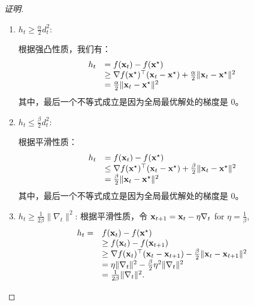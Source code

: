 \begin{proof}[证明]

\begin{enumerate}
\item  $h_t \geq \frac{\alpha}{2} d_t^2 $: %

根据强凸性质，我们有：
\begin{equation*}
\begin{array}{cl}
h_t & =  f(\mathbf x_t) - f(\mathbf x^{\star}) \\
& \geq  \nabla f(\mathbf x^{\star})^\top (\mathbf x_t - \mathbf x^{\star}) + \frac{\alpha}{2} \|\mathbf x_t - \mathbf x^{\star}\|^2  \\
 & = \frac{\alpha}{2} \|\mathbf x_t - \mathbf x^{\star}\|^2 
\end{array}
\end{equation*}
其中，最后一个不等式成立是因为全局最优解处的梯度是 0。
    
    \item  $h_t \leq \frac{\beta}{2} d_t^2 $:  %
    
根据平滑性质：
\begin{equation*}
\begin{array}{cl}
h_t & =  f(\mathbf x_t) - f(\mathbf x^{\star}) \\
& \leq  \nabla f(\mathbf x^{\star})^\top (\mathbf x_t - \mathbf x^{\star}) + \frac{\beta}{2} \|\mathbf x_t - \mathbf x^{\star}\|^2  \\
 & = \frac{\beta}{2} \|\mathbf x_t - \mathbf x^{\star}\|^2 
\end{array}
\end{equation*}
其中，最后一个不等式成立是因为全局最优解处的梯度是 0。



\item  $h_t \geq \frac{1}{2\beta} \|\nabla_t\|^2 $: %
根据平滑性质，令
$\mathbf x_{t+1} = \mathbf x_t - \eta \nabla_t$ for $\eta = \frac{1}{\beta}$, 
\begin{equation*}
\begin{array}{cl}
h_t =  & f(\mathbf x_t) - f(\mathbf x^{\star}) \\
& \geq  f(\mathbf x_t) - f(\mathbf x_{t+1})   \\
 & \geq   \nabla f(\mathbf x_t)^\top (\mathbf x_{t} - \mathbf x_{t+1}) - \frac{\beta}{2} \|\mathbf x_t - \mathbf x_{t+1} \|^2   \\
 & = \eta \|\nabla_t\|^2  - \frac{\beta}{2} \eta^2 \|\nabla_t\|^2 \\
 & = \frac{1}{2\beta} \|\nabla_t\|^2  .
\end{array}
\end{equation*}




\end{enumerate}
\end{proof}
